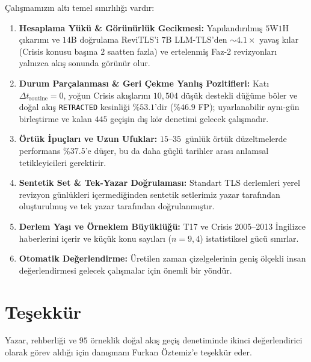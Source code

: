 ﻿\documentclass[journal]{IEEEtran}
\begin{document}
\c{C}al{\i}\c{s}mam{\i}z{\i}n alt{\i} temel s{\i}n{\i}rl{\i}l{\i}\u{g}{\i} vard{\i}r:
\begin{enumerate}
    \item \textbf{Hesaplama Y\"{u}k\"{u} \& G\"{o}r\"{u}n\"{u}rl\"{u}k Gecikmesi:} Yap{\i}land{\i}r{\i}lm{\i}\c{s} $5\text{W}1\text{H}$ \c{c}{\i}kar{\i}m{\i} ve $14\text{B}$ do\u{g}rulama ReviTLS'i $7\text{B}$ LLM-TLS'den $\sim 4.1\times$ yava\c{s} k{\i}lar (Crisis konusu ba\c{s}{\i}na $2$ saatten fazla) ve ertelenmi\c{s} Faz-2 revizyonlar{\i} yaln{\i}zca ak{\i}\c{s} sonunda g\"{o}r\"{u}n\"{u}r olur.
    \item \textbf{Durum Par\c{c}alanmas{\i} \& Geri \c{C}ekme Yanl{\i}\c{s} Pozitifleri:} Kat{\i} $\Delta t_{\text{routine}}=0$, yo\u{g}un Crisis ak{\i}\c{s}lar{\i}n{\i} $10{,}504$ d\"{u}\c{s}\"{u}k destekli d\"{u}\u{g}\"{u}me b\"{o}ler ve do\u{g}al ak{\i}\c{s} \texttt{RETRACTED} kesinli\u{g}i $\%53.1$'dir ($\%46.9$ FP); uyarlanabilir ayn{\i}-g\"{u}n birle\c{s}tirme ve kalan $445$ ge\c{c}i\c{s}in d{\i}\c{s} k\"{o}r denetimi gelecek \c{c}al{\i}\c{s}mad{\i}r.
    \item \textbf{\"{O}rt\"{u}k \.{I}pu\c{c}lar{\i} ve Uzun Ufuklar:} $15\text{--}35$~g\"{u}nl\"{u}k \"{o}rt\"{u}k d\"{u}zeltmelerde performans $\%37.5$'e d\"{u}\c{s}er, bu da daha g\"{u}\c{c}l\"{u} tarihler aras{\i} anlamsal tetikleyicileri gerektirir.
    \item \textbf{Sentetik Set \& Tek-Yazar Do\u{g}rulamas{\i}:} Standart TLS derlemleri yerel revizyon g\"{u}nl\"{u}kleri i\c{c}ermedi\u{g}inden sentetik setlerimiz yazar taraf{\i}ndan olu\c{s}turulmu\c{s} ve tek yazar taraf{\i}ndan do\u{g}rulanm{\i}\c{s}t{\i}r.
    \item \textbf{Derlem Ya\c{s}{\i} ve \"{O}rneklem B\"{u}y\"{u}kl\"{u}\u{g}\"{u}:} T17 ve Crisis 2005--2013 \.{I}ngilizce haberlerini i\c{c}erir ve k\"{u}\c{c}\"{u}k konu say{\i}lar{\i} ($n=9, 4$) istatistiksel g\"{u}c\"{u} s{\i}n{\i}rlar.
    \item \textbf{Otomatik De\u{g}erlendirme:} \"{U}retilen zaman \c{c}izelgelerinin geni\c{s} \"{o}l\c{c}ekli insan de\u{g}erlendirmesi gelecek \c{c}al{\i}\c{s}malar i\c{c}in \"{o}nemli bir y\"{o}nd\"{u}r.
\end{enumerate}

\section*{Te\c{s}ekk\"{u}r}
Yazar, rehberli\u{g}i ve $95$ \"{o}rneklik do\u{g}al ak{\i}\c{s} ge\c{c}i\c{s} denetiminde ikinci de\u{g}erlendirici olarak g\"{o}rev ald{\i}\u{g}{\i} i\c{c}in dan{\i}\c{s}man{\i} Furkan \"{O}ztemiz'e te\c{s}ekk\"{u}r eder.
\end{document}
